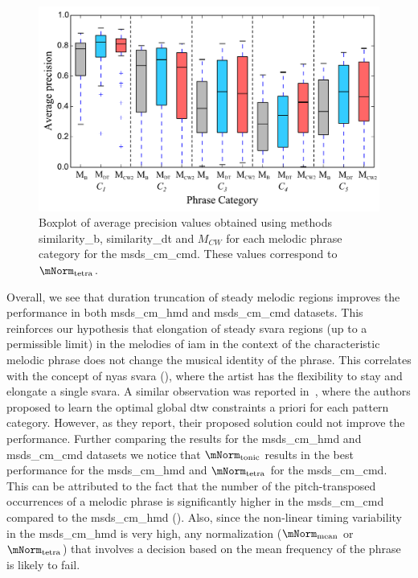 \begin{figure}
	\begin{center}
		\includegraphics[width=\figSizeEightyFive]{ch06_patterns/figures/ImprovingSimilarity/CarnaticPerCategoryPerformance_BOXPLOT.pdf}
	\end{center}
	\caption[Boxplot of average precision for different types of melodic patterns in the Carnatic music dataset]{Boxplot of average precision values obtained using methods \acrshort{similarity_b}, \acrshort{similarity_dt} and $M_{CW}$ for each melodic phrase category for the \acrshort{msds_cm_cmd}. These values correspond to $\mNorm_\mathrm{tetra}$.}
	\label{fig:carnaticPerCategoryPerformance}
\end{figure}


Overall, we see that duration truncation of steady melodic regions improves the performance in both \acrshort{msds_cm_hmd} and \acrshort{msds_cm_cmd} datasets. This reinforces our hypothesis that elongation of steady \gls{svara} regions (up to a permissible limit) in the melodies of \gls{iam} in the context of the characteristic melodic phrase does not change the musical identity of the phrase. This correlates with the concept of \gls{nyas} \gls{svara} (), where the artist has the flexibility to stay and elongate a single \gls{svara}. A similar observation was reported in~\cite{Rao2014}, where the authors proposed to learn the optimal global \gls{dtw} constraints a priori for each pattern category. However, as they report, their proposed solution could not improve the performance. Further comparing the results for the \acrshort{msds_cm_hmd} and \acrshort{msds_cm_cmd} datasets we notice that $\mNorm_\mathrm{tonic}$ results in the best performance for the \acrshort{msds_cm_hmd} and $\mNorm_\mathrm{tetra}$ for the \acrshort{msds_cm_cmd}. This can be attributed to the fact that the number of the pitch-transposed occurrences of a melodic phrase is significantly higher in the \acrshort{msds_cm_cmd} compared to the \acrshort{msds_cm_hmd} (). Also, since the non-linear timing variability in the \acrshort{msds_cm_hmd} is very high, any normalization ($\mNorm_\mathrm{mean}$ or $\mNorm_\mathrm{tetra}$) that involves a decision based on the mean frequency of the phrase is likely to fail.


